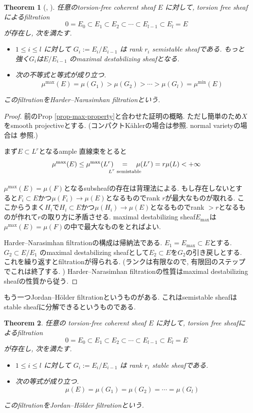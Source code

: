 \documentclass[dvipdfmx,a4paper,11pt]{article} %
\newtheorem{thm}{Theorem}[section]
\theoremstyle{definition}
\theoremstyle{remark}
\numberwithin{equation}{section}
\newcommand{\underalign}[2]{\quad \underset{\mathclap{\strut #1}}{#2}\quad}
\begin{document}
\begin{thm}[{\cite[Proposition 5.7.15]{Kob14}, \cite[2章]{Lazicnote}}]
任意のtorsion-free coherent sheaf \(E\) に対して, torsion free sheafによるfiltration
\[
0=E_0\subset E_1\subset E_2\subset \cdots \subset E_{l-1}\subset E_l=E
\]
が存在し, 次を満たす.
\begin{itemize}
\item $1\leq i\leq l$ に対して $G_i :=E_i/E_{i-1}$ は rank $r_i$ semistable sheafである. もっと強く$G_i $は$E/E_{i-1}$ のmaximal destabilizing sheafとなる. 
\item 次の不等式と等式が成り立つ. 
$$
\mu^{\max}(E)=\mu(G_1) >\mu(G_2) > \cdots >\mu(G_l) = \mu^{\min}(E)
$$
\end{itemize}
このfiltrationをHarder--Narasimhan filtrationという. 
\end{thm}
\begin{proof}
前のProp \ref{prop-max-property}と合わせた証明の概略. ただし簡単のため$X$をsmooth projectiveとする. (コンパクトKählerの場合は\cite[5章]{Kob14}参照. normal varietyの場合は \cite{GKP16a}参照.)

まず$E \subset L^{r}$となるample 直線束をとると
$$
\mu^{\max}(E) \le \mu^{\max}(L^{r})
\underalign{\text{$L^{r}$ semistable}}{=}
 \mu(L^{r}) = r\mu(L) <+\infty
$$

$\mu^{\max}(E) =\mu(F)$となるsubsheafの存在は背理法による.
もし存在しないとすると$F_i \subset E$かつ$\mu(F_i) \to \mu(E)$となるものでrank $r$が最大なものが取れる. ここからうまく$H_i$で$H_i \subset E$かつ$\mu(H_i) \to \mu(E)$となるものでrank $>r$となるものが作れて$r$の取り方に矛盾させる.
maximal destabilizing sheaf$E_{\max}$は$\mu^{\max}(E) =\mu(F)$の中で最大なものをとればよい.

Harder--Narasimhan filtrationの構成は帰納法である. 
$E_1=E_{\max} \subset E$とする. $G_2 \subset E/E_{1}$ のmaximal destabilizing sheafとして$E_2 \subset E$を$G_2$の引き戻しとする. これを繰り返すとfiltrationが得られる. (ランクは有限なので, 有限回のステップでこれは終了する. )
Harder--Narasimhan filtrationの性質はmaximal destabilizing sheafの性質から従う.
\end{proof}

もう一つJordan--Hölder filtrationというものがある.
これはsemistable sheafはstable sheafに分解できるというものである. 
\begin{thm}\cite{Kob14}
\label{prop-JN-filtration}
任意の torsion-free coherent sheaf \(E\) に対して, torsion free sheafによるfiltration
\[
0=E_0\subset E_1\subset E_2\subset \cdots \subset E_{l-1}\subset E_l=E
\]
が存在し, 次を満たす.
\begin{itemize}
\item $1\leq i\leq l$ に対して $G_i :=E_i/E_{i-1}$ は rank $r_i$ stable sheafである. 
\item 次の等式が成り立つ. 
$$
\mu(E)=\mu(G_1) =\mu(G_2) = \cdots = \mu(G_l) 
$$
\end{itemize}
このfiltrationをJordan--Hölder filtrationという. 
\end{thm}
\end{document}
